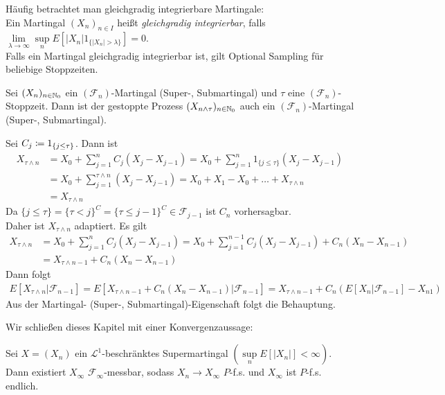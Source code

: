 \documentclass[a4paper,twoside,DIV15,BCOR12mm]{scrbook}
\newcommand{\cF}{\mathcal F}
\begin{document}
\begin{bemerkung}
Häufig betrachtet man gleichgradig integrierbare Martingale:\\
Ein Martingal $(X_n)_{n\in I}$ heißt \textit{gleichgradig integrierbar}, falls $\lim\limits_{\lambda\to\infty}\sup\limits_n E[|X_n| 1_{\{|X_n|>\lambda\}}]=0$.\\
Falls ein Martingal gleichgradig integrierbar ist, gilt Optional Sampling für beliebige Stoppzeiten.
\end{bemerkung}

\begin{satz}
\label{satz:2.1.35}Sei $(X_n)_{n\in\mathbb{N}_0}$ ein $(\cF_n)$-Martingal (Super-, Submartingal) und $\tau$ eine $(\cF_n)$-Stoppzeit. Dann ist der gestoppte Prozess $(X_{n\wedge\tau})_{n\in\mathbb{N}_0}$ auch ein $(\cF_n)$-Martingal (Super-, Submartingal).
\end{satz}
\begin{beweis}
Sei $C_j\da 1_{\{j\leq \tau\}}$. Dann ist
\begin{align*}
X_{\tau\wedge n}&=X_0+\sum\limits_{j=1}^n C_j (X_j-X_{j-1})=X_0+\sum\limits_{j=1}^n1_{\{j\leq\tau\}}(X_j-X_{j-1})\\
&=X_0+\sum\limits_{j=1}^{\tau\wedge n}(X_j-X_{j-1})=X_0+X_1-X_0+\ldots+X_{\tau\wedge n}\\
&= X_{\tau\wedge n}
\end{align*}
Da $\{j\leq\tau\}=\{\tau<j\}^C=\{\tau\leq j-1\}^C \in \cF_{j-1}$ ist $C_n$ vorhersagbar.\\
Daher ist $X_{\tau\wedge n}$ adaptiert. Es gilt
\begin{align*}
X_{\tau\wedge n}&=X_0+\sum\limits_{j=1}^n C_j (X_j-X_{j-1})=X_0+\sum\limits_{j=1}^{n-1}C_j(X_j-X_{j-1})+C_n(X_n-X_{n-1})\\
&= X_{\tau\wedge n-1}+C_n(X_n-X_{n-1})
\end{align*}
Dann folgt 
\begin{align*}
E[X_{\tau\wedge n}|\cF_{n-1}]=E[X_{\tau\wedge n-1}+C_n(X_n-X_{n-1})|\cF_{n-1}]=X_{\tau\wedge n-1}+C_n(E[X_n|\cF_{n-1}]-X_{n1})
\end{align*}
Aus der Martingal- (Super-, Submartingal)-Eigenschaft folgt die Behauptung.
\end{beweis}

Wir schließen dieses Kapitel mit einer Konvergenzaussage:
\begin{satz}Sei $X=(X_n)$ ein $\mathcal{L}^1$-beschränktes Supermartingal $(\sup\limits_n E[|X_n|]<\infty)$. Dann existiert $X_\infty$ $\cF_\infty$-messbar, sodass $X_n\to X_\infty$ $P$-f.s. und $X_\infty$ ist $P$-f.s. endlich.
\end{satz}
\end{document}
